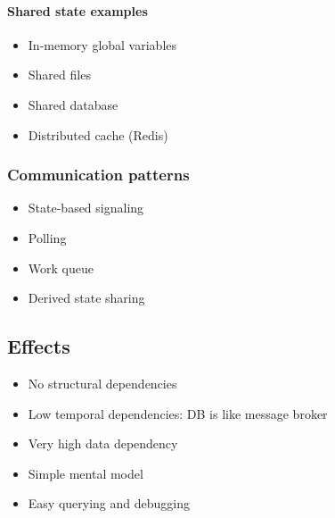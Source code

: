 \begin{flushleft}
  \begin{minipage}{0.47\linewidth}
    \raggedright
    \paragraph{Shared state examples}

    \begin{itemize}
      \item In-memory global variables
      \item Shared files
      \item Shared database
      \item Distributed cache (Redis)
    \end{itemize}

  \end{minipage}%
  \hfill
  \begin{minipage}{0.47\linewidth}
    \raggedright
    \subsubsection{Communication patterns}

    \begin{itemize}
      \item State-based signaling
      \item Polling
      \item Work queue
      \item Derived state sharing
    \end{itemize}
  \end{minipage}
\end{flushleft}


\subsection{Effects}
\begin{itemize}
  \item No structural dependencies
  \item Low temporal dependencies: DB is like message broker
  \item Very high data dependency
  \item Simple mental model
  \item Easy querying and debugging
\end{itemize}

